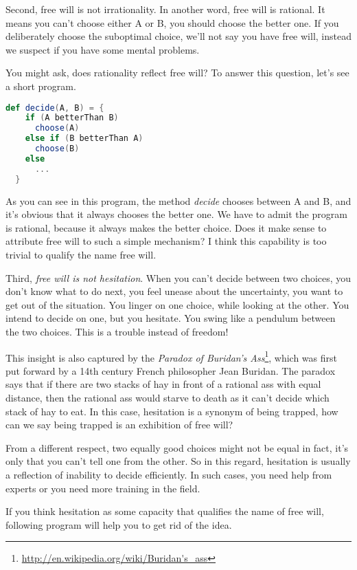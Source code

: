 Second, free will is not irrationality. In another word, free will is rational. It means you can't choose either A or B, you should choose the better one. If you deliberately choose the suboptimal choice, we'll not say you have free will, instead we suspect if you have some mental problems.

You might ask, does rationality reflect free will? To answer this question, let's see a short program.

\begin{lstlisting}[language=Scala]
  def decide(A, B) = {
    if (A betterThan B)
      choose(A)
    else if (B betterThan A)
      choose(B)
    else
      ...
  }
\end{lstlisting}

As you can see in this program, the method \emph{decide} chooses between A and B, and it's obvious that it always chooses the better one. We have to admit the program is rational, because it always makes the better choice. Does it make sense to attribute free will to such a simple mechanism? I think this capability is too trivial to qualify the name free will.

Third, \emph{free will is not hesitation}. When you can't decide between two choices, you don't know what to do next, you feel unease about the uncertainty, you want to get out of the situation. You linger on one choice, while looking at the other. You intend to decide on one, but you hesitate. You swing like a pendulum between the two choices. This is a trouble instead of freedom!

This insight is also captured by the \emph{Paradox of Buridan's Ass}\footnote{\url{http://en.wikipedia.org/wiki/Buridan's_ass}}, which was first put forward by a 14th century French philosopher Jean Buridan. The paradox says that if there are two stacks of hay in front of a rational ass with equal distance, then the rational ass would starve to death as it can't decide which stack of hay to eat. In this case, hesitation is a synonym of being trapped, how can we say being trapped is an exhibition of free will?

From a different respect, two equally good choices might not be equal in fact, it's only that you can't tell one from the other. So in this regard, hesitation is usually a reflection of inability to decide efficiently. In such cases, you need help from experts or you need more training in the field.

If you think hesitation as some capacity that qualifies the name of free will, following program will help you to get rid of the idea.

